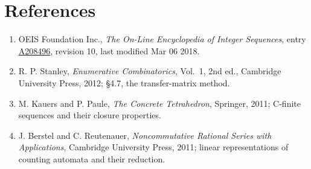 \documentclass[11pt]{article}
\theoremstyle{definition}
\begin{document}
\section{References}

\begin{enumerate}

\item OEIS Foundation Inc., \emph{The On-Line Encyclopedia of Integer Sequences}, entry \href{https://oeis.org/A208496}{A208496}, revision 10, last modified Mar 06 2018.

\item R. P. Stanley, \emph{Enumerative Combinatorics}, Vol.~1, 2nd ed., Cambridge University Press, 2012; \S4.7, the transfer-matrix method.

\item M. Kauers and P. Paule, \emph{The Concrete Tetrahedron}, Springer, 2011; C-finite sequences and their closure properties.

\item J. Berstel and C. Reutenauer, \emph{Noncommutative Rational Series with Applications}, Cambridge University Press, 2011; linear representations of counting automata and their reduction.

\end{enumerate}
\end{document}
